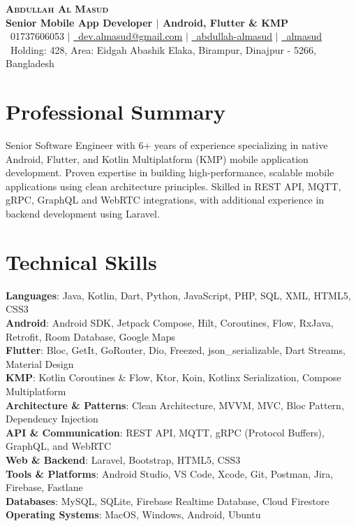 \documentclass[letterpaper,11pt]{article}
\begin{document}
\begin{center}
    \textbf{\Huge \scshape Abdullah Al Masud} \\ \vspace{5pt}
    \small \textbf{Senior Mobile App Developer $|$ Android, Flutter \& KMP} \\ \vspace{5pt}
    \small \faPhone\ 01737606053 $|$
    \href{mailto:dev.almasud@gmail.com}{\faEnvelope\ dev.almasud@gmail.com} $|$
    \href{https://linkedin.com/in/abdullah-almasud}{\faLinkedin\ abdullah-almasud} $|$
    \href{https://github.com/almasud}{\faGithub\ almasud} \\
    \small \faMapMarker\ Holding: 428, Area: Eidgah Abashik Elaka, Birampur, Dinajpur - 5266, Bangladesh
\end{center}

\section{Professional Summary}
\small{Senior Software Engineer with 6+ years of experience specializing in native Android, Flutter, and Kotlin Multiplatform (KMP) mobile application development. Proven expertise in building high-performance, scalable mobile applications using clean architecture principles. Skilled in REST API, MQTT, gRPC, GraphQL and WebRTC integrations, with additional experience in backend development using Laravel.}

\section{Technical Skills}
 \begin{itemize}[leftmargin=0.15in, label={}]
    \small{\item{
     \textbf{Languages}{: Java, Kotlin, Dart, Python, JavaScript, PHP, SQL, XML, HTML5, CSS3} \\
     \textbf{Android}{: Android SDK, Jetpack Compose, Hilt, Coroutines, Flow, RxJava, Retrofit, Room Database, Google Maps} \\
     \textbf{Flutter}{: Bloc, GetIt, GoRouter, Dio, Freezed, json\_serializable, Dart Streams, Material Design} \\
    \textbf{KMP}{: Kotlin Coroutines \& Flow, Ktor, Koin, Kotlinx Serialization, Compose Multiplatform} \\
     \textbf{Architecture \& Patterns}{: Clean Architecture, MVVM, MVC, Bloc Pattern, Dependency Injection} \\
     \textbf{API \& Communication}{: REST API, MQTT, gRPC (Protocol Buffers), GraphQL, and WebRTC} \\
     \textbf{Web \& Backend}{: Laravel, Bootstrap, HTML5, CSS3} \\
     \textbf{Tools \& Platforms}{: Android Studio, VS Code, Xcode, Git, Postman, Jira, Firebase, Fastlane} \\
     \textbf{Databases}{: MySQL, SQLite, Firebase Realtime Database, Cloud Firestore} \\
     \textbf{Operating Systems}{: MacOS, Windows, Android, Ubuntu}
    }}
 \end{itemize}
\end{document}
